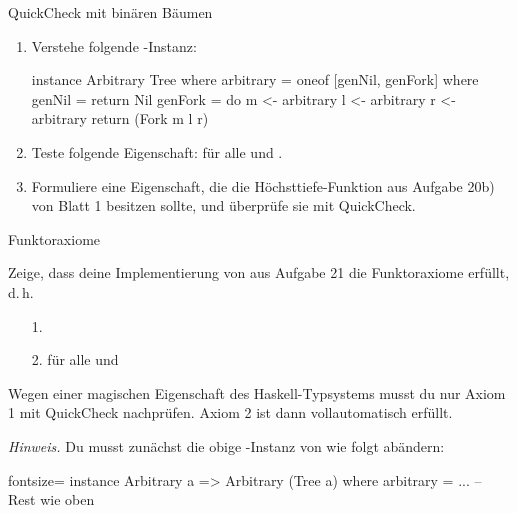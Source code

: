 \documentclass{uebblatt}
\newcommand{\refaufgabe}[1]{#1} %
\begin{document}
\begin{aufgabe}{QuickCheck mit binären Bäumen}
  \begin{enumerate}
    \item Verstehe folgende -Instanz:
\begin{haskellcode}
instance Arbitrary Tree where
  arbitrary = oneof [genNil, genFork]
    where
      genNil = return Nil
      genFork = do
        m <- arbitrary
        l <- arbitrary
        r <- arbitrary
        return (Fork m l r)
\end{haskellcode}

    \item Teste folgende Eigenschaft:
    für alle  und .
    
    \item Formuliere eine Eigenschaft, die die Höchsttiefe-Funktion aus Aufgabe \refaufgabe{20}b) von Blatt 1 besitzen sollte, und überprüfe sie mit QuickCheck.
  \end{enumerate}
\end{aufgabe}

\begin{aufgabe}{Funktoraxiome}
  
  Zeige, dass deine Implementierung von  aus Aufgabe \refaufgabe{21} die Funktoraxiome erfüllt, d.\,h.
  
  \begin{enumerate}
    \item[1.] 
    \item[2.]  für alle  und 
  \end{enumerate}
  
  Wegen einer magischen Eigenschaft des Haskell-Typsystems musst du nur Axiom 1
  mit QuickCheck nachprüfen. Axiom 2 ist dann vollautomatisch erfüllt.

  {\scriptsize \emph{Hinweis.} Du musst zunächst die obige
  -Instanz von
   wie folgt abändern:}

\begin{haskellcode*}{fontsize=\scriptsize}
instance Arbitrary a => Arbitrary (Tree a) where
  arbitrary = ... -- Rest wie oben
\end{haskellcode*}
\end{aufgabe}
\end{document}
